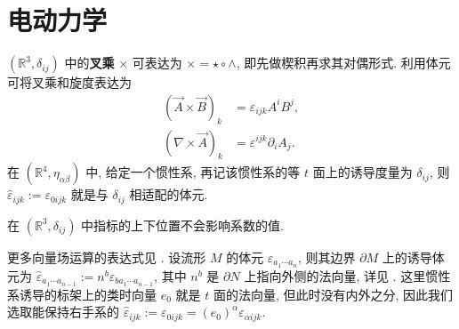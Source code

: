 \section{电动力学}
\begin{proposition}
    $ (\mathbb{R}^3,\delta_{ij}) $ 中的{\bf 叉乘} $ \times $ 可表达为 $ \times=\star\circ\wedge $, 即先做楔积再求其对偶形式. 利用体元可将叉乘和旋度表达为
    \begin{align*}
        (\vec{A}\times \vec{B})_k&=\varepsilon_{ijk}A^iB^j,\\ 
        (\nabla\times \vec{A})_k&=\varepsilon^{ijk}\partial_iA_j.
    \end{align*}
    在 $(\mathbb{R}^4,\eta_{\alpha\beta})$ 中, 给定一个惯性系, 再记该惯性系的等 $t$ 面上的诱导度量为 $\delta_{ij}$, 则 $\hat{\varepsilon}_{ijk}:=\varepsilon_{0ijk}$ 就是与 $\delta_{ij}$ 相适配的体元.
\end{proposition}
\begin{remark}
    在 $(\mathbb{R}^3,\delta_{ij})$ 中指标的上下位置不会影响系数的值.
\end{remark}
\begin{remark}
    更多向量场运算的表达式见 \cite[123 页]{梁灿彬2000微分几何入门与广义相对论}. 设流形 $M$ 的体元 $\varepsilon_{a_1\cdots a_n}$, 则其边界 $\partial M$ 上的诱导体元为 $\hat{\varepsilon}_{a_1\cdots a_{n-1}}:= n^b\varepsilon_{ba_1\cdots a_{n-1}}$, 其中 $n^b$ 是 $\partial N$ 上指向外侧的法向量, 详见 \cite[120 页]{梁灿彬2000微分几何入门与广义相对论}. 这里惯性系诱导的标架上的类时向量 $e_0$ 就是 $t$ 面的法向量, 但此时没有内外之分, 因此我们选取能保持右手系的 $\hat{\varepsilon}_{ijk}:=\varepsilon_{0ijk}=(e_0)^\alpha\varepsilon_{\alpha ijk}$. 
\end{remark}
